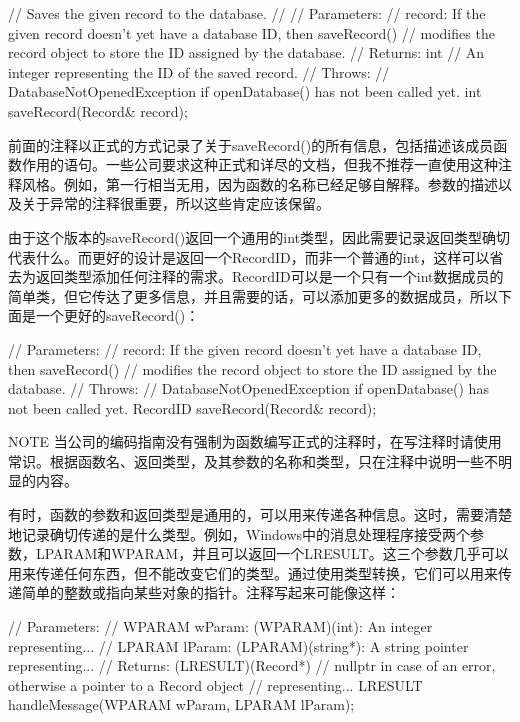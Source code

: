 \begin{cpp}
// Saves the given record to the database.
//
// Parameters:
//    record: If the given record doesn't yet have a database ID, then saveRecord()
//    modifies the record object to store the ID assigned by the database.
// Returns: int
//    An integer representing the ID of the saved record.
// Throws:
//    DatabaseNotOpenedException if openDatabase() has not been called yet.
int saveRecord(Record& record);
\end{cpp}

前面的注释以正式的方式记录了关于saveRecord()的所有信息，包括描述该成员函数作用的语句。一些公司要求这种正式和详尽的文档，但我不推荐一直使用这种注释风格。例如，第一行相当无用，因为函数的名称已经足够自解释。参数的描述以及关于异常的注释很重要，所以这些肯定应该保留。

由于这个版本的saveRecord()返回一个通用的int类型，因此需要记录返回类型确切代表什么。而更好的设计是返回一个RecordID，而非一个普通的int，这样可以省去为返回类型添加任何注释的需求。RecordID可以是一个只有一个int数据成员的简单类，但它传达了更多信息，并且需要的话，可以添加更多的数据成员，所以下面是一个更好的saveRecord()：

\begin{cpp}
// Parameters:
//    record: If the given record doesn't yet have a database ID, then saveRecord()
//    modifies the record object to store the ID assigned by the database.
// Throws:
//    DatabaseNotOpenedException if openDatabase() has not been called yet.
RecordID saveRecord(Record& record);
\end{cpp}

\begin{myNotic}{NOTE}
当公司的编码指南没有强制为函数编写正式的注释时，在写注释时请使用常识。根据函数名、返回类型，及其参数的名称和类型，只在注释中说明一些不明显的内容。
\end{myNotic}

有时，函数的参数和返回类型是通用的，可以用来传递各种信息。这时，需要清楚地记录确切传递的是什么类型。例如，Windows中的消息处理程序接受两个参数，LPARAM和WPARAM，并且可以返回一个LRESULT。这三个参数几乎可以用来传递任何东西，但不能改变它们的类型。通过使用类型转换，它们可以用来传递简单的整数或指向某些对象的指针。注释写起来可能像这样：

\begin{cpp}
// Parameters:
//    WPARAM wParam: (WPARAM)(int): An integer representing...
//    LPARAM lParam: (LPARAM)(string*): A string pointer representing...
// Returns: (LRESULT)(Record*)
//    nullptr in case of an error, otherwise a pointer to a Record object
//    representing...
LRESULT handleMessage(WPARAM wParam, LPARAM lParam);
\end{cpp}

